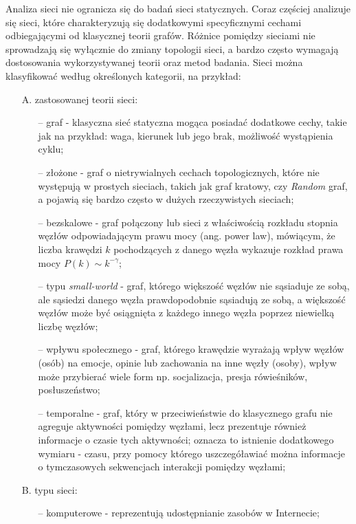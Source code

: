 \documentclass[12pt, twoside, final, openany]{mgr}
\begin{document}
\indent Analiza sieci nie ogranicza się do badań sieci statycznych. Coraz częściej analizuje się sieci, które charakteryzują się dodatkowymi specyficznymi cechami odbiegającymi od klasycznej teorii grafów. Różnice pomiędzy sieciami nie sprowadzają się wyłącznie do zmiany topologii sieci, a bardzo często wymagają dostosowania wykorzystywanej teorii oraz metod badania. Sieci można klasyfikować według określonych kategorii\cite{BOCCALETTI2006175, HOLME201297}, na przykład:
\begin{itemize}
\item[A.] zastosowanej teorii sieci:
	\begin{itemize}
	\item[--] graf - klasyczna sieć statyczna mogąca posiadać dodatkowe cechy, takie jak na przykład: waga, kierunek lub jego brak, możliwość wystąpienia cyklu; 
	\item[--] złożone - graf o nietrywialnych cechach topologicznych, które nie występują w prostych sieciach, takich jak graf kratowy, czy \textit{Random} graf, a pojawią się bardzo często w dużych rzeczywistych sieciach;
	\item[--] bezskalowe - graf połączony lub sieci z właściwością rozkładu stopnia węzłów odpowiadającym prawu mocy (ang. power law), mówiącym, że liczba krawędzi $k$ pochodzących z danego węzła wykazuje rozkład prawa mocy $P(k) \sim k^{-\gamma}$;
	\item[--] typu \textit{small-world} - graf, którego większość węzłów nie sąsiaduje ze sobą, ale sąsiedzi danego węzła prawdopodobnie sąsiadują ze sobą, a większość węzłów może być osiągnięta z każdego innego węzła poprzez niewielką liczbę węzłów;
	\item[--] wpływu społecznego - graf, którego krawędzie wyrażają wpływ węzłów (osób) na emocje, opinie lub zachowania na inne węzły (osoby), wpływ może przybierać wiele form np. socjalizacja, presja rówieśników, posłuszeństwo;
	\item[--] temporalne - graf, który w przeciwieństwie do klasycznego grafu nie agreguje aktywności pomiędzy węzłami, lecz prezentuje również informacje o czasie tych aktywności; oznacza to istnienie dodatkowego wymiaru - czasu, przy pomocy którego uszczegóławiać można informacje o tymczasowych sekwencjach interakcji pomiędzy węzłami;   
	\end{itemize}
\item[B.] typu sieci:
	\begin{itemize}
	\item[--] komputerowe - reprezentują udostępnianie zasobów w Internecie; 

\end{itemize}
\end{itemize}
\end{document}
